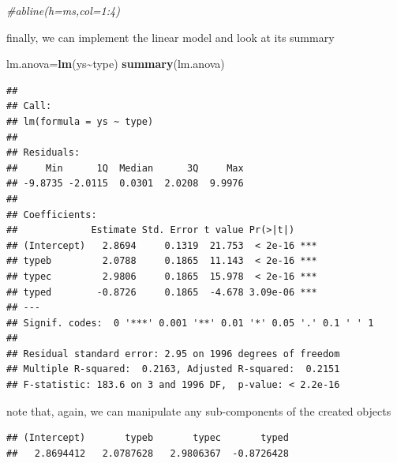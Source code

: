 \documentclass[
]{book}
\newenvironment{Shaded}{\begin{snugshade}}{\end{snugshade}}
\newcommand{\CommentTok}[1]{\textcolor[rgb]{0.56,0.35,0.01}{\textit{#1}}}
\newcommand{\DecValTok}[1]{\textcolor[rgb]{0.00,0.00,0.81}{#1}}
\newcommand{\FunctionTok}[1]{\textcolor[rgb]{0.13,0.29,0.53}{\textbf{#1}}}
\newcommand{\NormalTok}[1]{#1}
\newcommand{\OtherTok}[1]{\textcolor[rgb]{0.56,0.35,0.01}{#1}}
\newcommand{\SpecialCharTok}[1]{\textcolor[rgb]{0.81,0.36,0.00}{\textbf{#1}}}
\begin{document}
\begin{Shaded}
\begin{Highlighting}[]
\CommentTok{\#abline(h=ms,col=1:4)}
\end{Highlighting}
\end{Shaded}

finally, we can implement the linear model and look at its summary

\begin{Shaded}
\begin{Highlighting}[]
\NormalTok{lm.anova}\OtherTok{=}\FunctionTok{lm}\NormalTok{(ys}\SpecialCharTok{\textasciitilde{}}\NormalTok{type)}
\FunctionTok{summary}\NormalTok{(lm.anova)}
\end{Highlighting}
\end{Shaded}

\begin{verbatim}
## 
## Call:
## lm(formula = ys ~ type)
## 
## Residuals:
##     Min      1Q  Median      3Q     Max 
## -9.8735 -2.0115  0.0301  2.0208  9.9976 
## 
## Coefficients:
##             Estimate Std. Error t value Pr(>|t|)    
## (Intercept)   2.8694     0.1319  21.753  < 2e-16 ***
## typeb         2.0788     0.1865  11.143  < 2e-16 ***
## typec         2.9806     0.1865  15.978  < 2e-16 ***
## typed        -0.8726     0.1865  -4.678 3.09e-06 ***
## ---
## Signif. codes:  0 '***' 0.001 '**' 0.01 '*' 0.05 '.' 0.1 ' ' 1
## 
## Residual standard error: 2.95 on 1996 degrees of freedom
## Multiple R-squared:  0.2163, Adjusted R-squared:  0.2151 
## F-statistic: 183.6 on 3 and 1996 DF,  p-value: < 2.2e-16
\end{verbatim}

note that, again, we can manipulate any sub-components of the created objects

\begin{Shaded}
\end{Shaded}

\begin{verbatim}
## (Intercept)       typeb       typec       typed 
##   2.8694412   2.0787628   2.9806367  -0.8726428
\end{verbatim}

\begin{Shaded}
\end{Shaded}
\end{document}
